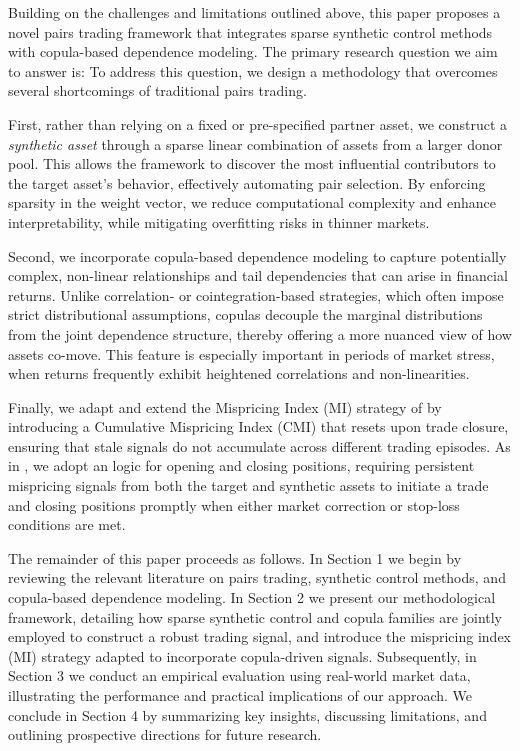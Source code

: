 Building on the challenges and limitations outlined above, this paper proposes a novel pairs trading framework that integrates sparse synthetic control methods with copula-based dependence modeling. 
%
%
The primary research question we aim to answer is: 
%
%
To address this question, we design a methodology that overcomes several shortcomings of traditional pairs trading. 

First, rather than relying on a fixed or pre-specified partner asset, we construct a \emph{synthetic asset} through a sparse linear combination of assets from a larger donor pool. This allows the framework to discover the most influential contributors to the target asset's behavior, effectively automating pair selection. By enforcing sparsity in the weight vector, we reduce computational complexity and enhance interpretability, while mitigating overfitting risks in thinner markets.

Second, we incorporate copula-based dependence modeling to capture potentially complex, non-linear relationships and tail dependencies that can arise in financial returns. Unlike correlation- or cointegration-based strategies, which often impose strict distributional assumptions, copulas decouple the marginal distributions from the joint dependence structure, thereby offering a more nuanced view of how assets co-move. This feature is especially important in periods of market stress, when returns frequently exhibit heightened correlations and non-linearities.

Finally, we adapt and extend the Mispricing Index (MI) strategy of \cite{Xie2016} by introducing a Cumulative Mispricing Index (CMI) that resets upon trade closure, ensuring that stale signals do not accumulate across different trading episodes. As in \cite{Rad2016}, we adopt an  logic for opening and closing positions, requiring persistent mispricing signals from both the target and synthetic assets to initiate a trade and closing positions promptly when either market correction or stop-loss conditions are met.


The remainder of this paper proceeds as follows. 
%
In Section 1 %
we begin by reviewing the relevant literature on pairs trading, synthetic control methods, and copula-based dependence modeling. 
%
In Section 2 %
we present our methodological framework, detailing how sparse synthetic control and copula families are jointly employed to construct a robust trading signal, and introduce the mispricing index (MI) strategy adapted to incorporate copula-driven signals. 
%
Subsequently, in Section 3 %
we conduct an empirical evaluation using real-world market data, illustrating the performance and practical implications of our approach. 
%
We conclude in Section 4 %
by summarizing key insights, discussing limitations, and outlining prospective directions for future research.
